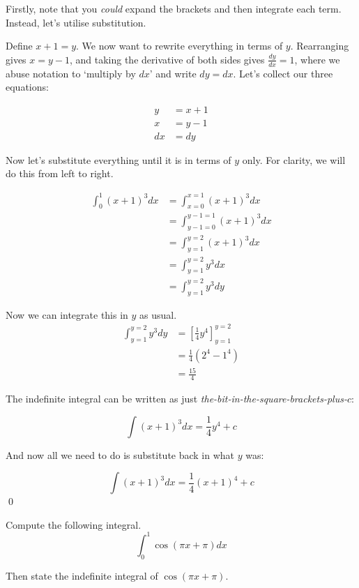 \begin{solution}
    Firstly, note that you \emph{could} expand the brackets and then integrate each term. Instead, let's utilise substitution.

    Define $x+1 = y$. We now want to rewrite everything in terms of $y$. Rearranging gives $x = y-1$, and taking the derivative of both sides gives
    $\frac{dy}{dx} = 1$, where we abuse notation to `multiply by $dx$' and write $dy = dx$. Let's collect our three equations:

    \begin{align*}
        y &= x+1 \\
        x &= y-1 \\
        dx &= dy
    \end{align*}

    Now let's substitute everything until it is in terms of $y$ only. For clarity, we will do this from left to right.

    \begin{align*}
        \int_{0}^{1} (x+1)^3 dx  &= \int_{x=0}^{x=1} (x+1)^3 dx \\
         &= \int_{y-1=0}^{y-1=1} (x+1)^3 dx \tag{using $x = y-1$} \\
         &= \int_{y=1}^{y=2} (x+1)^3 dx \tag{rearranging integral bounds} \\
         &= \int_{y=1}^{y=2} y^3 dx \tag{using $y = x+1$} \\
         &= \int_{y=1}^{y=2} y^3 dy \tag{using $dx = dy$}
    \end{align*}

    Now we can integrate this in $y$ as usual.
    \begin{align*}
        \int_{y=1}^{y=2} y^3 dy &= \left[ \frac{1}{4}y^4 \right]_{y=1}^{y=2} \\
         &= \frac{1}{4} \left( 2^4 - 1^4 \right) \\
         &= \frac{15}{4}
    \end{align*}

    The indefinite integral can be written as just \emph{the-bit-in-the-square-brackets-plus-$c$}:

    \[ \int (x+1)^3 dx  = \frac{1}{4}y^4 + c \]

    And now all we need to do is substitute back in what $y$ was:

    \[ \int (x+1)^3 dx  = \frac{1}{4}(x+1)^4 + c \]
    \qed
\end{solution}


\begin{example}
    Compute the following integral.
    \[ \int_{0}^{1} \cos(\pi x + \pi) dx \]

    Then state the indefinite integral of $\cos(\pi x + \pi)$.
\end{example}

